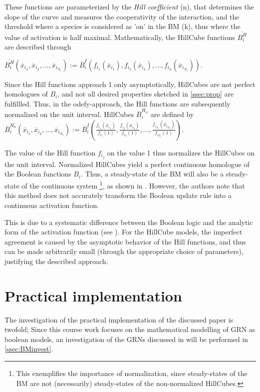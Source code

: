 \documentclass[11pt]{article}
\begin{document}
These functions are parameterized by the \textit{Hill coefficient} (n), that determines the slope of the curve and measures the cooperativity of the interaction, and the threshold where a species is considered as 'on' in the BM (k), thus where the value of activation is half maximal. Mathematically, the HillCube functions $\overline{B_{i}^{H}}$ are described through 

$\overline{B_{i}^{H}} (\overline{x}_{i_{1}}, \overline{x}_{i_{2}},..., \overline{x}_{i_{N_{i}}} ) := \overline{B}_{i}^{I} (f_{i_{1}}(\overline{x}_{i_{1}}), f_{i_{2}} (\overline{x}_{i_{2}}),..., f_{i_{n}} (\overline{x}_{i_{N_{i}}}) )$.

Since the Hill functions approach 1 only asymptotically, HillCubes are not perfect homologues of $B_{i}$, and not all desired properties sketched in \ref{ssec:prop} are fulfillled. Thus, in the odefy-approach, the Hill functions are subsequently normalized on the unit interval. HillCubes $\overline{B}_{i}^{H_{n}}$ are defined by $\overline{B}_{i}^{H_{n}} (\overline{x}_{i_{1}}, \overline{x}_{i_{2}}, ..., \overline{x}_{i_{N_{i}}}) := \overline{B}_{i}^{I} ( \frac{f_{i_{1}}(\overline{x}_{i_1})}{f_{i_{1}} (1)}, \frac{f_{i_{2}}(\overline{x}_{i_2})}{f_{i_{2}} (1)}, ..., \frac{f_{i_{N_{i}}}(\overline{x}_{i_{N_{i}}})}{f_{i_{N_{i}}} (1)})$.

The value of the Hill function $f_{i_{j}}$ on the value 1 thus normalizes the HillCubes on the unit interval. Normalized HillCubes yield a perfect continuous homologue of the Boolean functions $B_{i}$. Thus, a steady-state of the BM will
also be a steady-state of the continuous system \footnote{This exemplifies the importance of normalization, since steady-states of the BM are not (necessarily) steady-states of the non-normalized HillCubes.}, as shown in \cite{Wittmann}. However, the authors note that this method does not accurately transform the Boolean update rule into a continuous activation function. 

This is due to a systematic difference between the Boolean logic and the analytic form of the activation function (see \cite{Wittmann}). For the HillCube models, the imperfect agreement is caused by the asymptotic behavior of the Hill
functions, and thus can be made arbitrarily small (through the appropriate choice of parameters), justifying the described approach.

\section{Practical implementation} \label{sec:Results}
The investigation of the practical implementation of the discussed paper is twofold; Since this course work focuses on the mathematical modelling of GRN as boolean models, an investigation of the GRNs discussed in \cite{Kirkham} will be performed in \ref{ssec:BMinvest}. 
\end{document}
